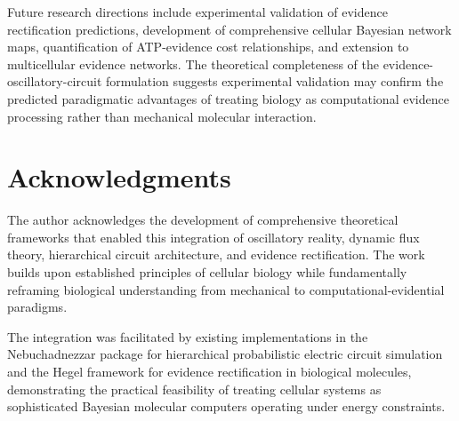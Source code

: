 \documentclass[12pt,a4paper]{article}
\begin{document}
Future research directions include experimental validation of evidence rectification predictions, development of comprehensive cellular Bayesian network maps, quantification of ATP-evidence cost relationships, and extension to multicellular evidence networks. The theoretical completeness of the evidence-oscillatory-circuit formulation suggests experimental validation may confirm the predicted paradigmatic advantages of treating biology as computational evidence processing rather than mechanical molecular interaction.

\section{Acknowledgments}

The author acknowledges the development of comprehensive theoretical frameworks that enabled this integration of oscillatory reality, dynamic flux theory, hierarchical circuit architecture, and evidence rectification. The work builds upon established principles of cellular biology while fundamentally reframing biological understanding from mechanical to computational-evidential paradigms.

The integration was facilitated by existing implementations in the Nebuchadnezzar package for hierarchical probabilistic electric circuit simulation and the Hegel framework for evidence rectification in biological molecules, demonstrating the practical feasibility of treating cellular systems as sophisticated Bayesian molecular computers operating under energy constraints.
\end{document}
